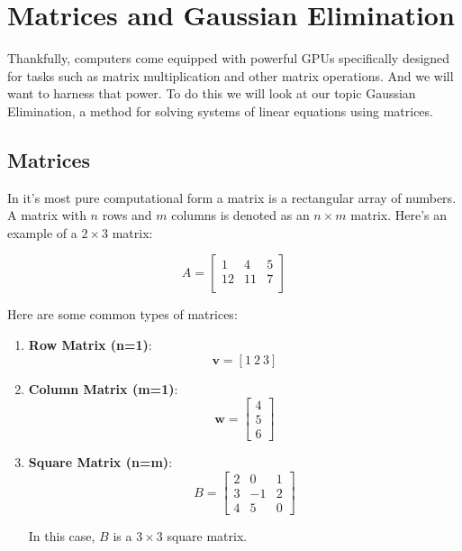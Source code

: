 \documentclass{article}
\begin{document}
\newpage

\section*{Matrices and Gaussian Elimination}

Thankfully, computers come equipped with powerful GPUs specifically designed for tasks such as matrix multiplication and other matrix operations. And we will want to harness that power. To do this we will look at our topic Gaussian Elimination, a method for solving systems of linear equations using matrices.

\subsection*{Matrices}

In it's most pure computational form a matrix is a rectangular array of numbers. A matrix with \(n\) rows and \(m\) columns is denoted as an \(n \times m\) matrix. Here's an example of a \(2 \times 3\) matrix:

\[
A = 
\begin{bmatrix}
    1 & 4 & 5 \\
    12 & 11 & 7 \\
\end{bmatrix}
\]


Here are some common types of matrices:

\begin{enumerate}
    \item \textbf{Row Matrix (n=1)}:
    \[
    \mathbf{v} = [1 \ 2 \ 3]
    \]
    \item \textbf{Column Matrix (m=1)}: 
    \[
    \mathbf{w} =
    \begin{bmatrix}
        4 \\
        5 \\
        6
    \end{bmatrix}
    \]
    
    \item \textbf{Square Matrix (n=m)}: 
    \[
    B =
    \begin{bmatrix}
        2 & 0 & 1 \\
        3 & -1 & 2 \\
        4 & 5 & 0
    \end{bmatrix}
    \]
    
    In this case, \(B\) is a \(3 \times 3\) square matrix.
    
\end{enumerate}
\end{document}
